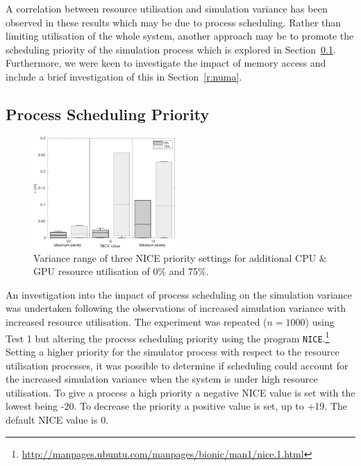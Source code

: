 \documentclass[runningheads,twocolumn,a4paper,10pt]{llncs}
\begin{document}
A correlation between resource utilisation and simulation variance has been observed in these results which may be due to process scheduling. Rather than limiting utilisation of the whole system, another approach may be to promote the scheduling priority of the simulation process which is explored in Section~\ref{r:process_scheduling}. Furthermore, we were keen to investigate the impact of memory access and include a brief investigation of this in Section~\ref{r:numa}. 
%


\subsection{Process Scheduling Priority} \label{r:process_scheduling}

\begin{figure}[t]
    \centering
    \includegraphics[width=0.48\textwidth]{Other/Figures/NICE_analysis_summary_V4.pdf}
    \caption{Variance range of three NICE priority settings for additional CPU \& GPU resource utilisation of 0\% and 75\%.}
    \label{NICEExperimentStressSummary}
\end{figure}

An investigation into the impact of process scheduling on the simulation variance was undertaken following the observations of increased simulation variance with increased resource utilisation. The experiment was repeated ($n=1000$) using Test 1 but altering the process scheduling priority using the program \texttt{NICE}.\footnote{\url{http://manpages.ubuntu.com/manpages/bionic/man1/nice.1.html}} Setting a higher priority for the simulator process with respect to the resource utilisation processes, it was possible to determine if scheduling could account for the increased simulation variance when the system is under high resource utilisation.
%
To give a process a high priority a negative NICE value is set with the lowest being -20. To decrease the priority a positive value is set, up to +19. The default NICE value is 0.
\end{document}
